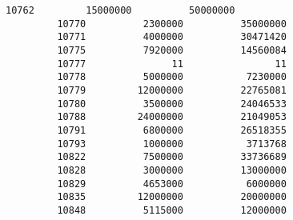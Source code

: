 \documentclass[11pt]{article}
\begin{document}
\begin{Verbatim}[commandchars=\\\{\}]
         10762         15000000          50000000   
         10770          2300000          35000000   
         10771          4000000          30471420   
         10775          7920000          14560084   
         10777               11                11   
         10778          5000000           7230000   
         10779         12000000          22765081   
         10780          3500000          24046533   
         10788         24000000          21049053   
         10791          6800000          26518355   
         10793          1000000           3713768   
         10822          7500000          33736689   
         10828          3000000          13000000   
         10829          4653000           6000000   
         10835         12000000          20000000   
         10848          5115000          12000000   
         

\end{Verbatim}
\end{document}
